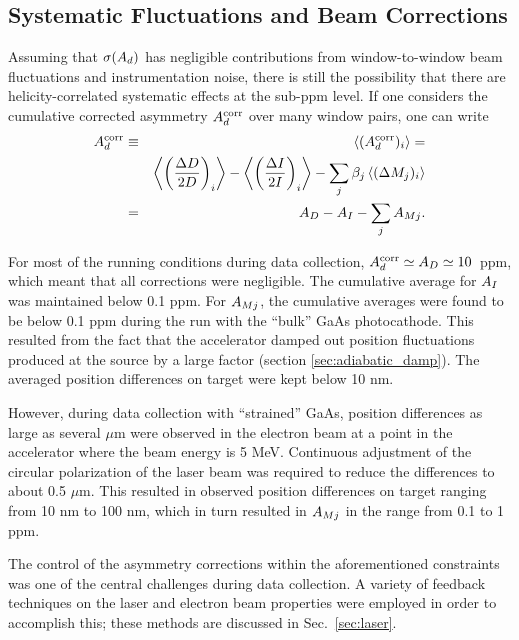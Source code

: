 \subsection{Systematic Fluctuations and Beam Corrections}
\label{sec:beamcorr}

Assuming that $\sigma(A_d)$ has negligible contributions from
window-to-window beam fluctuations and instrumentation noise,
there is still the possibility that there are 
helicity-correlated systematic effects at the sub-ppm
level. If one considers the cumulative corrected asymmetry
$A^{\rm corr}_d$ over many window pairs, one can write
\begin{eqnarray}
A^{\rm corr}_d & \equiv & \langle (A^{\rm corr}_d)_i\rangle = 
\nonumber \\
&  & 
\left\langle\left(\frac{\Delta D}{2D}\right)_i\right\rangle -
\left\langle\left(\frac{\Delta I}{2I}\right)_i\right\rangle
- \sum_j {\beta_j\left\langle{(\Delta M_j)_i}\right\rangle} 
\nonumber \\
&=& A_D -  A_I - \sum_j A_{Mj}.
\end{eqnarray}

For most of the running conditions during data collection,
$A^{\rm corr}_d\simeq A_D\simeq 10$~ppm, which meant that all
corrections were negligible. The cumulative average for $A_I$ was
maintained below 0.1 ppm. For $A_{Mj}$, the cumulative averages
were found to be below 0.1 ppm during the run with the ``bulk'' GaAs
photocathode. This resulted from the fact that the accelerator
damped out position fluctuations produced at the source by a large
factor (section \ref{sec:adiabatic_damp}). 
The averaged position differences 
on target were kept below 10 nm.

However, during data collection with ``strained'' GaAs, position
differences as large as several $\mu$m were observed in the
electron beam at a point in the accelerator where the beam energy is
5 MeV. Continuous adjustment of the circular polarization of the
laser beam was required to reduce the differences to about 0.5
$\mu$m. This resulted in observed position differences on target
ranging from 10 nm to 100 nm, which in turn resulted in $A_{Mj}$
in the range from 0.1 to 1 ppm.

The control of the asymmetry corrections within the aforementioned
constraints was one of the central challenges during data
collection. A variety of feedback techniques on the laser and
electron beam properties were employed in order to accomplish
this; these methods are discussed in Sec.~\ref{sec:laser}.
